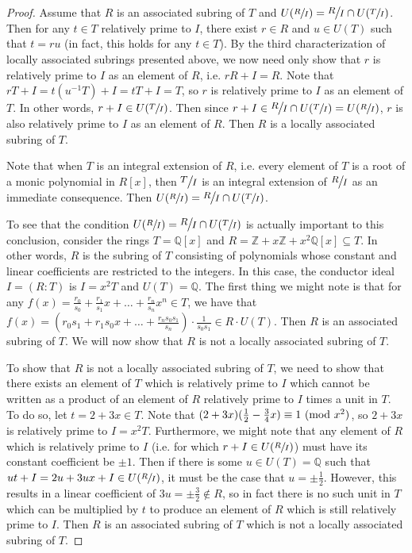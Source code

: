 \documentclass[12pt]{amsart}
\theoremstyle{definition}
\newcommand{\bZ}{\mathbb Z}
\newcommand{\bQ}{\mathbb Q}
\newcommand{\modulo}[1]{\textup{ (mod }#1)}
\newcommand{\quot}[2]{\large\sfrac{#1}{#2}\normalsize}
\begin{document}
	\begin{proof}
		Assume that $R$ is an associated subring of $T$ and $U(\sfrac{R}{I})=\quot{R}{I}\cap U(\sfrac{T}{I})$. Then for any $t\in T$ relatively prime to $I$, there exist $r\in R$ and $u\in U(T)$ such that $t=ru$ (in fact, this holds for any $t\in T$). By the third characterization of locally associated subrings presented above, we now need only show that $r$ is relatively prime to $I$ as an element of $R$, i.e. $rR+I=R$. Note that $rT+I=t(u^{-1}T)+I=tT+I=T$, so $r$ is relatively prime to $I$ as an element of $T$. In other words, $r+I\in U(\sfrac{T}{I})$. Then since $r+I\in \quot{R}{I}\cap U(\sfrac{T}{I})=U(\sfrac{R}{I})$, $r$ is also relatively prime to $I$ as an element of $R$. Then $R$ is a locally associated subring of $T$.
		
		Note that when $T$ is an integral extension of $R$, i.e. every element of $T$ is a root of a monic polynomial in $R[x]$, then $\quot{T}{I}$ is an integral extension of $\quot{R}{I}$ as an immediate consequence. Then $U(\sfrac{R}{I})=\quot{R}{I}\cap U(\sfrac{T}{I})$.
		
		To see that the condition $U(\sfrac{R}{I})=\quot{R}{I}\cap U(\sfrac{T}{I})$ is actually important to this conclusion, consider the rings $T=\bQ[x]$ and $R=\bZ+x\bZ+x^2\bQ[x]\subseteq T$. In other words, $R$ is the subring of $T$ consisting of polynomials whose constant and linear coefficients are restricted to the integers. In this case, the conductor ideal $I=(R:T)$ is $I=x^2T$ and $U(T)=\bQ$. The first thing we might note is that for any $f(x)=\frac{r_0}{s_0}+\frac{r_1}{s_1}x+\dots+\frac{r_n}{s_n}x^n\in T$, we have that $f(x)=\left(r_0s_1+r_1s_0x+\dots+\frac{r_ns_0s_1}{s_n}\right)\cdot \frac{1}{s_0s_1}\in R\cdot U(T)$. Then $R$ is an associated subring of $T$. We will now show that $R$ is not a locally associated subring of $T$.
		
		To show that $R$ is not a locally associated subring of $T$, we need to show that there exists an element of $T$ which is relatively prime to $I$ which cannot be written as a product of an element of $R$ relatively prime to $I$ times a unit in $T$. To do so, let $t=2+3x\in T$. Note that $(2+3x)(\frac{1}{2}-\frac{3}{4}x)\equiv 1\modulo{x^2}$, so $2+3x$ is relatively prime to $I=x^2 T$. Furthermore, we might note that any element of $R$ which is relatively prime to $I$ (i.e. for which $r+I\in U(\sfrac{R}{I})$) must have its constant coefficient be $\pm 1$. Then if there is some $u\in U(T)=\bQ$ such that $ut+I=2u+3ux+I\in U(\sfrac{R}{I})$, it must be the case that $u=\pm \frac{1}{2}$. However, this results in a linear coefficient of $3u=\pm\frac{3}{2}\notin R$, so in fact there is no such unit in $T$ which can be multiplied by $t$ to produce an element of $R$ which is still relatively prime to $I$. Then $R$ is an associated subring of $T$ which is not a locally associated subring of $T$.
		

\end{proof}
\end{document}
